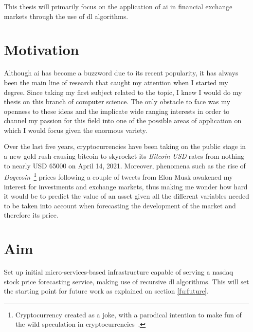 This thesis will primarily focus on the application of \gls{ai} in financial exchange markets through the use of \gls{dl} algorithms.

\section{Motivation}

Although \gls{ai} has become a buzzword due to its recent popularity, it has always been the main line of research that caught my attention when I started my degree. Since taking my first subject related to the topic, I knew I would do my thesis on this branch of computer science. The only obstacle to face was my openness to these ideas and the implicate wide ranging interests in order to channel my passion for this field into one of the possible areas of application on which I would focus given the enormous variety. 

Over the last five years, cryptocurrencies have been taking on the public stage in a new gold rush causing bitcoin to skyrocket its \textit{Bitcoin-USD} rates from nothing to nearly USD 65000 on April 14, 2021. Moreover, phenomena such as the rise of \textit{Dogecoin}~\footnote{Cryptocurrency created as a joke, with a parodical intention to make fun of the wild speculation in cryptocurrencies~\cite{dogeDefinition}.} prices following a couple of tweets from Elon Musk awakened my interest for investments and exchange markets, thus making me wonder how hard it would be to predict the value of an asset given all the different variables needed to be taken into account when forecasting the development of the market and therefore its price.

\section{Aim}

Set up initial micro-services-based infrastructure capable of serving a \acrshort{nasdaq} stock price forecasting service, making use of recursive \gls{dl} algorithms. This will set the starting point for future work as explained on section \ref{fu:future}.

\newpage
